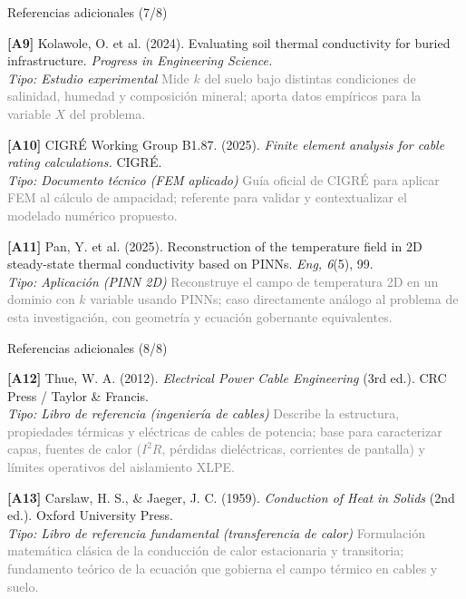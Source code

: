 \documentclass[aspectratio=169]{beamer}
\begin{document}
\begin{frame}{Referencias adicionales (7/8)}
\small\justifying

\textbf{[A9]} Kolawole, O. et al. (2024). Evaluating soil thermal
conductivity for buried infrastructure. \textit{Progress in Engineering
Science.}\\
\textcolor{purple!70!black}{\footnotesize\textit{Tipo: Estudio experimental}} \quad
\textcolor{gray}{\footnotesize Mide $k$ del suelo bajo distintas condiciones de
salinidad, humedad y composición mineral; aporta datos empíricos para la
variable $X$ del problema.}

\medskip
\textbf{[A10]} CIGRÉ Working Group B1.87. (2025). \textit{Finite element
analysis for cable rating calculations.} CIGRÉ.\\
\textcolor{purple!70!black}{\footnotesize\textit{Tipo: Documento técnico (FEM aplicado)}} \quad
\textcolor{gray}{\footnotesize Guía oficial de CIGRÉ para aplicar FEM al cálculo
de ampacidad; referente para validar y contextualizar el modelado numérico
propuesto.}

\medskip
\textbf{[A11]} Pan, Y. et al. (2025). Reconstruction of the temperature field
in 2D steady-state thermal conductivity based on PINNs. \textit{Eng,
6}(5), 99.\\
\textcolor{purple!70!black}{\footnotesize\textit{Tipo: Aplicación (PINN 2D)}} \quad
\textcolor{gray}{\footnotesize Reconstruye el campo de temperatura 2D en un
dominio con $k$ variable usando PINNs; caso directamente análogo al problema
de esta investigación, con geometría y ecuación gobernante equivalentes.}

\medskip
\end{frame}

\begin{frame}{Referencias adicionales (8/8)}
\small\justifying

\textbf{[A12]} Thue, W. A. (2012). \textit{Electrical Power Cable Engineering}
(3rd ed.). CRC Press / Taylor \& Francis.\\
\textcolor{purple!70!black}{\footnotesize\textit{Tipo: Libro de referencia (ingeniería de cables)}} \quad
\textcolor{gray}{\footnotesize Describe la estructura, propiedades térmicas y
eléctricas de cables de potencia; base para caracterizar capas, fuentes de calor
($I^2 R$, pérdidas dieléctricas, corrientes de pantalla) y límites operativos
del aislamiento XLPE.}

\medskip
\textbf{[A13]} Carslaw, H. S., \& Jaeger, J. C. (1959). \textit{Conduction of
Heat in Solids} (2nd ed.). Oxford University Press.\\
\textcolor{purple!70!black}{\footnotesize\textit{Tipo: Libro de referencia fundamental (transferencia de calor)}} \quad
\textcolor{gray}{\footnotesize Formulación matemática clásica de la conducción
de calor estacionaria y transitoria; fundamento teórico de la ecuación que
gobierna el campo térmico en cables y suelo.}
\end{frame}
\end{document}
